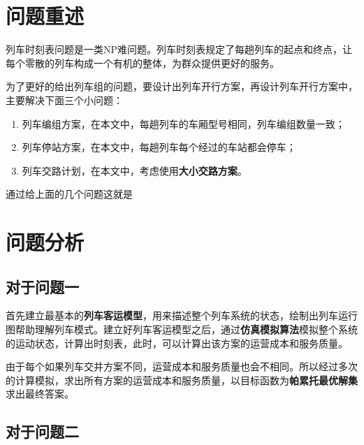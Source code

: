 \setcounter{page}{1}        %

%
%

\section{问题重述}



列车时刻表问题是一类NP难问题\cite{caoJiyuchengkedengdaishijiandechengshiguidaojiaotongliecheshikebiaoyouhuamoxingyusuanfayanjiu2021}。列车时刻表规定了每趟列车的起点和终点，让每个零散的列车构成一个有机的整体，为群众提供更好的服务。

为了更好的给出列车组的问题，要设计出列车开行方案，再设计列车开行方案中，主要解决下面三个小问题：

\begin{enumerate}
    \item 列车编组方案，在本文中，每趟列车的车厢型号相同，列车编组数量一致；
    \item 列车停站方案，在本文中，每趟列车每个经过的车站都会停车；
    \item 列车交路计划，在本文中，考虑使用\textbf{大小交路方案}。
\end{enumerate}

通过给上面的几个问题这就是

%
%

\section{问题分析}

\subsection{对于问题一}

首先建立最基本的\textbf{列车客运模型}，用来描述整个列车系统的状态，绘制出列车运行图帮助理解列车模式。建立好列车客运模型之后，通过\textbf{仿真模拟算法}模拟整个系统的运动状态，计算出时刻表，此时，可以计算出该方案的运营成本和服务质量。

由于每个如果列车交并方案不同，运营成本和服务质量也会不相同。所以经过多次的计算模拟，求出所有方案的运营成本和服务质量，以目标函数为\textbf{帕累托最优解集}求出最终答案。

\subsection{对于问题二}

